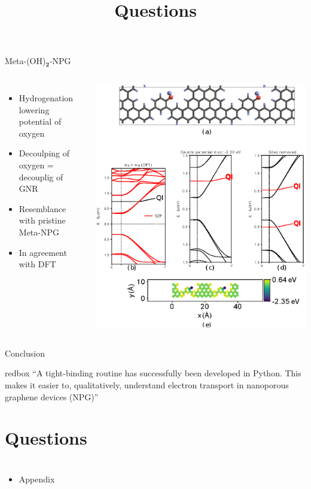 \documentclass[hyperref={colorlinks=true,urlcolor=blue,linkcolor=.},aspectratio=1610,mathserif]{beamer}
\newcommand*\mathinhead[2]{\texorpdfstring{$\boldsymbol{#1}$}{#2}}
\begin{document}
\begin{frame}{Meta-(OH)\mathinhead{_2}{_2}-NPG}
\centering
\begin{columns}[c]
    \begin{itemize}
        \item Hydrogenation lowering potential of oxygen
        \item Decoulping of oxygen = decouplig of GNR 
        \item Resemblance with pristine Meta-NPG 
        \item In agreement with DFT
    \end{itemize}
    \includegraphics[height=.8\textwidth]{Figures/fig22.eps}
\end{columns}
\end{frame}

\begin{frame}{Conclusion}
	\centering
	\begin{beamercolorbox}[sep=1em,wd=15cm]{redbox}
		``A tight-binding routine has successfully been developed in Python. This makes it easier to, qualitatively, understand electron transport in nanoporous graphene devices (NPG)''\huge\checkmark
	\end{beamercolorbox}
\end{frame}

\section*{Questions}
\title{Questions}
\subtitle{}
\begin{frame}
	\titlepage
\end{frame}

\appendix
\section{}
\begin{frame}{}
	\begin{itemize}
		\item Appendix
	\end{itemize}
\end{frame}
\end{document}
